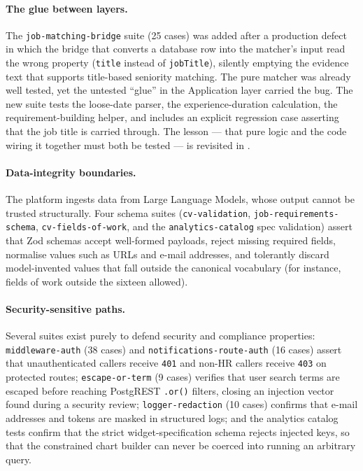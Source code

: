 \paragraph{The glue between layers.}
The \texttt{job-matching-bridge} suite (25 cases) was added after a
production defect in which the bridge that converts a database row into the
matcher's input read the wrong property (\texttt{title} instead of
\texttt{jobTitle}), silently emptying the evidence text that supports
title-based seniority matching. The pure matcher was already well tested,
yet the untested ``glue'' in the Application layer carried the bug. The
new suite tests the loose-date parser, the experience-duration calculation,
the requirement-building helper, and includes an explicit regression case
asserting that the job title is carried through. The lesson --- that pure
logic and the code wiring it together must both be tested --- is revisited
in .

\paragraph{Data-integrity boundaries.}
The platform ingests data from Large Language Models, whose output cannot be
trusted structurally. Four schema suites (\texttt{cv-validation},
\texttt{job-requirements-schema}, \texttt{cv-fields-of-work}, and the
\texttt{analytics-catalog} spec validation) assert that
Zod schemas accept well-formed payloads, reject missing required fields,
normalise values such as URLs and e-mail addresses, and tolerantly discard
model-invented values that fall outside the canonical vocabulary (for
instance, fields of work outside the sixteen allowed).

\paragraph{Security-sensitive paths.}
Several suites exist purely to defend security and compliance properties:
\texttt{middleware-auth} (38 cases) and \texttt{notifications-route-auth}
(16 cases) assert that unauthenticated callers receive \texttt{401} and
non-HR callers receive \texttt{403} on protected routes; \texttt{escape-or-term}
(9 cases) verifies that user search terms are escaped before reaching
PostgREST \texttt{.or()} filters, closing an injection vector found during a
security review; \texttt{logger-redaction} (10 cases) confirms that e-mail addresses
and tokens are masked in structured logs; and the analytics catalog tests
confirm that the strict widget-specification schema rejects injected keys,
so that the constrained chart builder can never be coerced into running an
arbitrary query.


